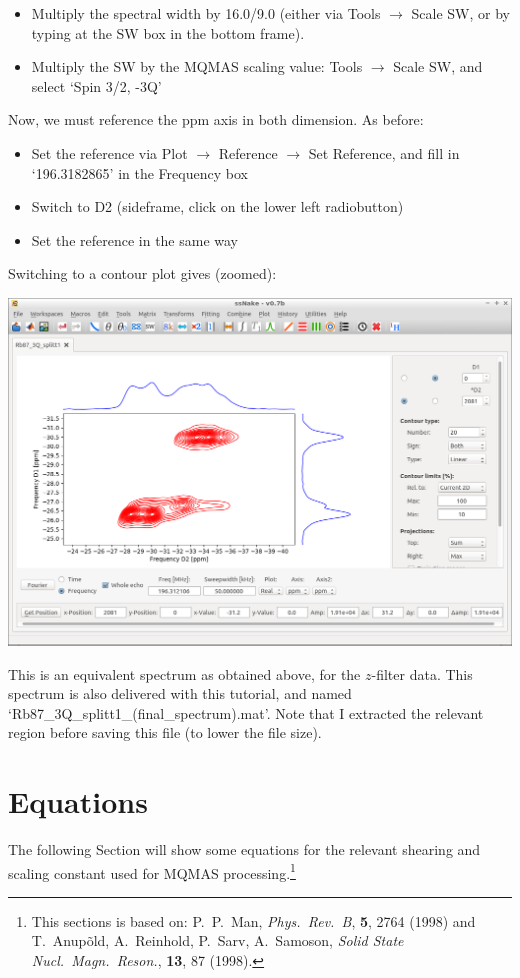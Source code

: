\documentclass[11pt,a4paper]{article}
\begin{document}
\begin{itemize}
	\item Multiply the spectral width by 16.0/9.0 (either via Tools  $\longrightarrow$ Scale SW, or
	  by typing at the SW box in the bottom frame).
	\item Multiply the SW by the MQMAS scaling value: Tools  $\longrightarrow$ Scale SW, and select `Spin 3/2, -3Q'
\end{itemize}
Now, we must reference the ppm axis in both dimension. As before:
\begin{itemize}
  \item Set the reference via Plot $\longrightarrow$ Reference $\longrightarrow$ Set Reference, and
	 fill in `196.3182865' in the Frequency box
	\item Switch to D2 (sideframe, click on the lower left radiobutton)
	\item Set the reference in the same way
\end{itemize}
Switching to a contour plot gives (zoomed):
\begin{center}
\includegraphics[width=0.8\linewidth]{Figs/Fig11.png}
\end{center}
This is an equivalent spectrum as obtained above, for the $z$-filter data.
This spectrum is also delivered with this tutorial, and named `Rb87\_3Q\_splitt1\_(final\_spectrum).mat'.
Note that I extracted the relevant region before saving this file (to lower the file size).


\section{Equations}
The following Section will show some equations for the relevant shearing and scaling constant used
for MQMAS processing.\footnote{This sections is based on:
  P.\ P.\ Man, \textit{Phys.\ Rev.\ B}, \textbf{5}, 2764 (1998) and 
  T.\ Anup\~{o}ld, A.\ Reinhold, P.\ Sarv, A.\ Samoson, \textit{Solid State Nucl.\ Magn.\ Reson.},
  \textbf{13}, 87 (1998).
  }
\end{document}
